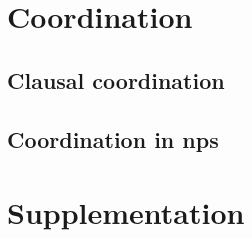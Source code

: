 \documentclass[UTF8, a4paper, oneside, scheme=plain]{ctexart}
\begin{document}
\section{Coordination}\label{sec:coord}

\subsection{Clausal coordination}\label{sec:clause-coord}

\subsection{Coordination in \ac{np}s}

\section{Supplementation}\label{sec:clause-supp}



\end{document}
